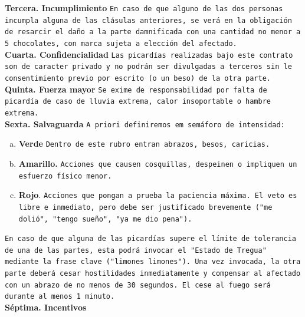 \documentclass[11pt]{scrartcl}
\begin{document}
\textbf{Tercera. Incumplimiento} \texttt{En caso de que alguno de las dos personas incumpla alguna de las clásulas anteriores, se verá en la obligación de resarcir el daño a la parte
damnificada con una cantidad no menor a 5 chocolates, con marca sujeta a elección del afectado.} \\
\textbf{Cuarta. Confidencialidad} \texttt{Las picardías realizadas bajo este contrato son de caracter privado y no podrán ser divulgadas a terceros sin le consentimiento previo por escrito (o un beso)
de la otra parte.} \\
\textbf{Quinta. Fuerza mayor} \texttt{Se exime de responsabilidad por falta de picardía de caso de lluvia extrema, calor insoportable o hambre extrema.} \\
\textbf{Sexta. Salvaguarda} \texttt{A priori definiremos em semáforo de intensidad:}
\begin{enumerate}[a)]
    \item \textbf{Verde} \texttt{Dentro de este rubro entran abrazos, besos, caricias.} \\
    \item \textbf{Amarillo.} \texttt{Acciones que causen cosquillas, despeinen o impliquen un esfuerzo físico menor.} \\
    \item \textbf{Rojo}. \texttt{Acciones que pongan a prueba la paciencia máxima. El veto es libre e inmediato, pero debe ser justificado brevemente ("me dolió", "tengo sueño", "ya me dio pena").}
\end{enumerate}
\texttt{En caso de que alguna de las picardías supere el límite de tolerancia de una de las partes, esta podrá invocar el "Estado de Tregua" mediante la frase clave ("limones limones").
Una vez invocada, la otra parte deberá cesar hostilidades inmediatamente y compensar al afectado con un abrazo de no menos de 30 segundos. El cese al fuego será durante al menos 1 minuto.} \\
\textbf{Séptima. Incentivos}
\end{document}
